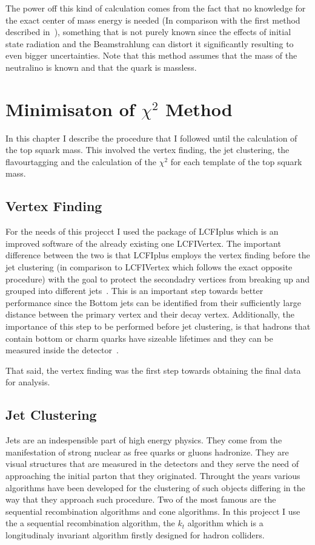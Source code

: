 \documentclass[12pt,a4paper]{report}
\begin{document}
The power off this kind of calculation comes from the fact that no knowledge for the exact center of mass 
energy is needed (In comparison with the first method described in~\cite{simon2010techniques}), something that is not purely known since the effects of initial state radiation and
the Beamstrahlung can distort it significantly resulting to even bigger uncertainties. Note that this method 
assumes that the mass of the neutralino is known and that the quark is massless. 

\section{Minimisaton of $\chi^{2}$ Method}

In this chapter I describe the procedure that I followed until the calculation of the top squark mass. 
This involved the vertex finding, the jet clustering, the flavourtagging and the calculation of the $\chi^{2}$
for each template of the top squark mass.

\subsection{Vertex Finding}

For the needs of this projecct I used the package of LCFIplus which is an improved software of the already 
existing one LCFIVertex. The important difference between the  two is that LCFIplus employs the vertex finding 
before the jet clustering (in comparison to LCFIVertex which follows the exact opposite procedure) with the 
goal to protect the secondadry vertices from breaking up and grouped into different jets~\cite{suehara2016lcfiplus}.
This is an important step towards better performance since the Bottom jets can be identified from their 
sufficiently large distance between the primary vertex and their decay vertex. Additionally, the importance
of this step to be performed before jet clustering, is that hadrons that contain bottom or charm quarks 
have sizeable lifetimes and they can be measured inside the detector~\cite{suehara2016lcfiplus}.


That said, the vertex finding was the first step towards obtaining the final data for analysis.

\subsection{Jet Clustering}

Jets are an indespensible part of high energy physics. They come from the manifestation of strong nuclear
as free quarks or gluons hadronize. They are visual structures that are measured in the detectors and they
serve the need of approaching the initial parton that they originated. Throught the years various algorithms 
have been developed for the clustering of such objects differing in the way that they approach such procedure.
Two of the most famous are the sequential recombination algorithms and cone algorithms. In this projecct I use
the a sequential recombination algorithm, the $k_{t}$ algorithm which is a longitudinaly invariant algorithm
firstly designed for hadron colliders.
\end{document}
